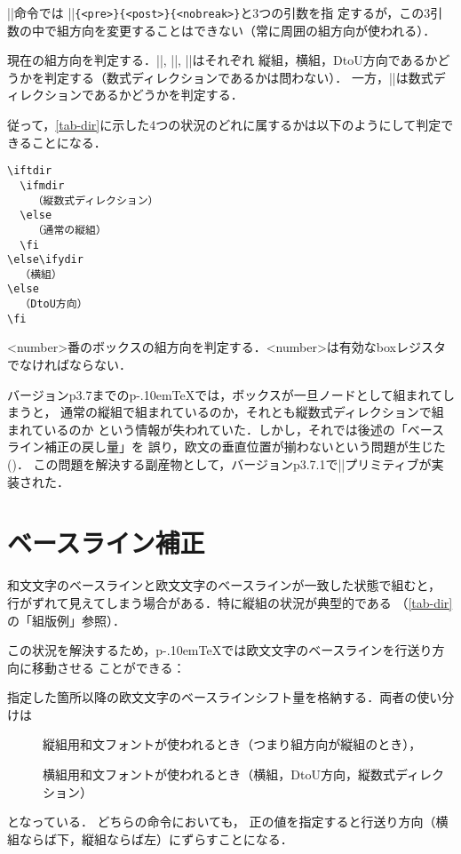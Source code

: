 \documentclass[a4paper,11pt,nomag]{jsarticle}
\def\pTeX{p\kern-.10em\TeX}
\begin{document}
\begin{dangerous}
 |\discretionary|命令では
|\discretionary|\texttt{\{<pre>\}\{<post>\}\{<nobreak>\}}と3つの引数を指
 定するが，この3引数の中で組方向を変更することはできない（常に周囲の組方向が使われる）．
\end{dangerous}

\begin{cslist}
  現在の組方向を判定する．|\iftdir|, |\ifydir|, |\ifddir|はそれぞれ
  縦組，横組，DtoU方向であるかどうかを判定する（数式ディレクションであるかは問わない）．
  一方，|\ifmdir|は数式ディレクションであるかどうかを判定する．

  従って，\autoref{tab-dir}に示した4つの状況のどれに属するかは以下のようにして判定できることになる．
  \begin{verbatim}
\iftdir
  \ifmdir
    （縦数式ディレクション）
  \else
    （通常の縦組）
  \fi
\else\ifydir
  （横組）
\else
  （DtoU方向）
\fi
  \end{verbatim}

  <number>番のボックスの組方向を判定する．<number>は有効なboxレジスタでなければならない．

  バージョンp3.7までの\pTeX では，ボックスが一旦ノードとして組まれてしまうと，
  通常の縦組で組まれているのか，それとも縦数式ディレクションで組まれているのか
  という情報が失われていた．しかし，それでは後述の「ベースライン補正の戻し量」を
  誤り，欧文の垂直位置が揃わないという問題が生じた(\cite{tatemath})．
  この問題を解決する副産物として，バージョンp3.7.1で|\ifmbox|プリミティブが実装された．
\end{cslist}

\section{ベースライン補正}
\label{sec:baselineshift}

和文文字のベースラインと欧文文字のベースラインが一致した状態で組むと，
行がずれて見えてしまう場合がある．特に縦組の状況が典型的である
（\autoref{tab-dir}の「組版例」参照）．

この状況を解決するため，\pTeX では欧文文字のベースラインを行送り方向に移動させる
ことができる：

\begin{cslist}
\csitem[\.{tbaselineshift}=<dimen>, \.{ybaselineshift}=<dimen>]
 指定した箇所以降の欧文文字のベースラインシフト量を格納する．両者の使い分けは
 \begin{description}
  \item[\texttt{\string\tbaselineshift}]
         縦組用和文フォントが使われるとき（つまり組方向が縦組のとき），
  \item[\texttt{\string\ybaselineshift}]
         横組用和文フォントが使われるとき（横組，DtoU方向，縦数式ディレクション）
 \end{description}
 となっている．
 どちらの命令においても，
 正の値を指定すると行送り方向（横組ならば下，縦組ならば左）にずらすことになる．
\end{cslist}
\end{document}
